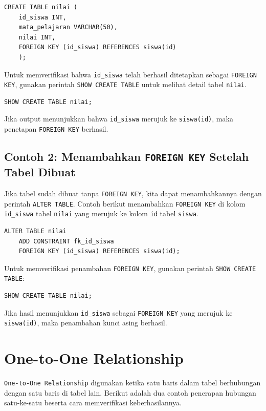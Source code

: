 \begin{lstlisting}[style=sql]
	CREATE TABLE nilai (
	id_siswa INT,
	mata_pelajaran VARCHAR(50),
	nilai INT,
	FOREIGN KEY (id_siswa) REFERENCES siswa(id)
	);
\end{lstlisting}

Untuk memverifikasi bahwa \texttt{id\_siswa} telah berhasil ditetapkan sebagai \texttt{FOREIGN KEY}, gunakan perintah \texttt{SHOW CREATE TABLE} untuk melihat detail tabel \texttt{nilai}.

\begin{lstlisting}[style=sql]
	SHOW CREATE TABLE nilai;
\end{lstlisting}

Jika output menunjukkan bahwa \texttt{id\_siswa} merujuk ke \texttt{siswa(id)}, maka penetapan \texttt{FOREIGN KEY} berhasil.

\subsection*{Contoh 2: Menambahkan \texttt{FOREIGN KEY} Setelah Tabel Dibuat}
Jika tabel sudah dibuat tanpa \texttt{FOREIGN KEY}, kita dapat menambahkannya dengan perintah \texttt{ALTER TABLE}. Contoh berikut menambahkan \texttt{FOREIGN KEY} di kolom \texttt{id\_siswa} tabel \texttt{nilai} yang merujuk ke kolom \texttt{id} tabel \texttt{siswa}.

\begin{lstlisting}[style=sql]
	ALTER TABLE nilai
	ADD CONSTRAINT fk_id_siswa
	FOREIGN KEY (id_siswa) REFERENCES siswa(id);
\end{lstlisting}

Untuk memverifikasi penambahan \texttt{FOREIGN KEY}, gunakan perintah \texttt{SHOW CREATE TABLE}:

\begin{lstlisting}[style=sql]
	SHOW CREATE TABLE nilai;
\end{lstlisting}

Jika hasil menunjukkan \texttt{id\_siswa} sebagai \texttt{FOREIGN KEY} yang merujuk ke \texttt{siswa(id)}, maka penambahan kunci asing berhasil.

\section{One-to-One Relationship}

\texttt{One-to-One Relationship} digunakan ketika satu baris dalam tabel berhubungan dengan satu baris di tabel lain. Berikut adalah dua contoh penerapan hubungan satu-ke-satu beserta cara memverifikasi keberhasilannya.

